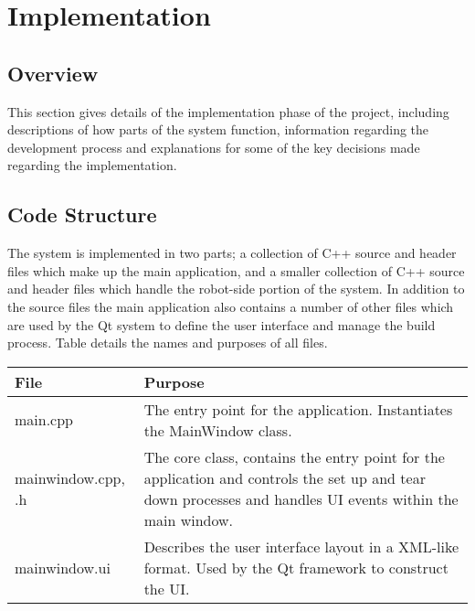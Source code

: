 
\chapter[Implementation]{Implementation} %

\label{Chapter9} %


\section{Overview}
This section gives details of the implementation phase of the project, including descriptions of how parts of the system function, information regarding the development process and explanations for some of the key decisions made regarding the implementation. 


\section{Code Structure}
The system is implemented in two parts; a collection of C++ source and header files which make up the main application, and a smaller collection of C++ source and header files which handle the robot-side portion of the system. In addition to the source files the main application also contains a number of other files which are used by the Qt system to define the user interface and manage the build process. Table  details the names and purposes of all files.

\begin{longtable}{ l p{10cm} }
 File & Purpose\\ 
 \hline
 main.cpp & The entry point for the application. Instantiates the MainWindow class.\\
 mainwindow.cpp, .h & The core class, contains the entry point for the application and controls the set up and tear down processes and handles UI events within the main window.\\
 mainwindow.ui & Describes the user interface layout in a XML-like format. Used by the Qt framework to construct the UI.

\end{longtable}


